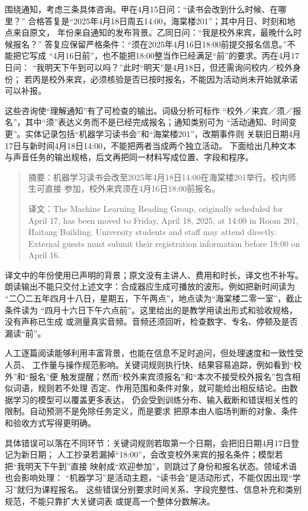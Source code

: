 围绕通知，考虑三条具体咨询。甲在4月15日问：“读书会改到什么时候、在哪里？”
合格答复是“2025年4月18日周五14:00，海棠楼201”；其中月日、时刻和地点来自原文，
年份来自通知的发布背景。乙同日问：“我是校外来宾，最晚什么时候报名？”
答复应保留严格条件：“须在2025年4月16日18:00前提交报名信息。”不能把它写成
“4月16日前”，也不能把18:00整当作已经满足“前”的要求。丙在4月17日问：
“我明天下午到可以吗？”此时“明天”是4月18日，但还需询问校内／校外身份；
若丙是校外来宾，必须核验是否已按时报名，不能因为活动尚未开始就承诺可以补报。

这些咨询使“理解通知”有了可检查的输出。词级分析可标作
“校外／来宾／须／报名”，其中“须”表达义务而不是已经完成报名；通知类别可为
“活动通知、时间变更”。实体记录包括“机器学习读书会”和“海棠楼201”，改期事件则
关联旧日期4月17日与新时间4月18日14:00，不能把两者当成两个独立活动。
下面给出几种文本与声音任务的输出规格，后文再把同一材料写成位置、字段和程序。

\begin{quote}
摘要：机器学习读书会改至2025年4月18日14:00在海棠楼201举行。校内师生可直接
参加，校外来宾须在4月16日18:00前报名。

译文：The Machine Learning Reading Group, originally scheduled for April 17,
has been moved to Friday, April 18, 2025, at 14:00 in Room 201, Haitang
Building. University students and staff may attend directly. External guests
must submit their registration information before 18:00 on April 16.
\end{quote}

译文中的年份使用已声明的背景；原文没有主讲人、费用和时长，译文也不补写。
朗读输出不能只交付上述文字：合成器应生成可播放的波形。例如把新时间读为
“二〇二五年四月十八日，星期五，下午两点”，地点读为“海棠楼二零一室”，截止条件读为
“四月十六日下午六点前”。这里给出的是教学用读出形式和验收规格，没有声称已生成
或测量真实音频。音频还须回听，检查数字、专名、停顿及是否漏读“前”。

人工逐篇阅读能够利用丰富背景，也能在信息不足时追问，但处理速度和一致性受人员、
工作量与操作规范影响。关键词规则执行快、结果容易追踪，例如看到“校外”和“报名”便
触发提醒；然而“校外来宾须报名”和“本次不接受校外报名”包含相似词语，规则若不处理
否定、作用范围和条件对象，就可能给出相反结论。由数据学习的模型可以覆盖更多表达，
仍会受到训练分布、输入截断和错误相关性的限制。自动预测不是免除任务定义，而是要求
把原本由人临场判断的对象、条件和验收方式写得更明确。

具体错误可以落在不同环节：关键词规则若取第一个日期，会把旧日期4月17日登记为新日期；
人工抄录若漏掉“18:00”，会改变校外来宾的报名条件；模型若把“我明天下午到”直接
映射成“欢迎参加”，则跳过了身份和报名状态。领域术语也会影响处理：
“机器学习”是活动主题，“读书会”是活动形式，不能仅因出现“学习”就归为课程报名。
这些错误分别要求时间关系、字段完整性、信息补充和类别规范，不能只靠扩大关键词表
或提高一个整体分数解决。

